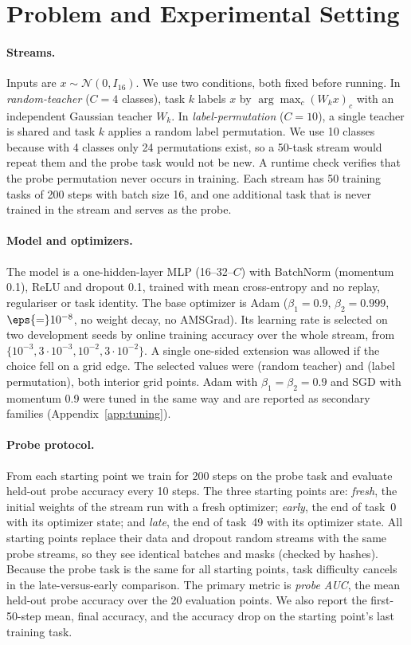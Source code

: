 \section{Problem and Experimental Setting}
\label{sec:setting}

\paragraph{Streams.}
Inputs are $x\sim\mathcal N(0,I_{16})$. We use two conditions, both fixed before running.
In \emph{random-teacher} ($C{=}4$ classes), task $k$ labels $x$ by $\arg\max_c (W_k x)_c$ with an
independent Gaussian teacher $W_k$. In \emph{label-permutation} ($C{=}10$), a single teacher is shared
and task $k$ applies a random label permutation. We use 10 classes because with 4 classes only 24
permutations exist, so a 50-task stream would repeat them and the probe task would not be new. A runtime
check verifies that the probe permutation never occurs in training. Each stream has 50 training tasks of
200 steps with batch size 16, and one additional task that is never trained in the stream and serves as
the probe.

\paragraph{Model and optimizers.}
The model is a one-hidden-layer MLP (16--32--$C$) with BatchNorm (momentum 0.1), ReLU and dropout 0.1,
trained with mean cross-entropy and no replay, regulariser or task identity. The base optimizer is Adam
($\beta_1{=}0.9$, $\beta_2{=}0.999$, $\eps{=}10^{-8}$, no weight decay, no AMSGrad). Its learning rate is
selected on two development seeds by online training accuracy over the whole stream, from
$\{10^{-3},3{\cdot}10^{-3},10^{-2},3{\cdot}10^{-2}\}$. A single one-sided extension was allowed if the
choice fell on a grid edge. The selected values were \RTTuneAdamLr{} (random teacher) and \LPTuneAdamLr{} (label permutation), both
interior grid points. Adam with $\beta_1{=}\beta_2{=}0.9$ and SGD with momentum 0.9 were tuned in the same way and are
reported as secondary families (Appendix~\ref{app:tuning}).

\paragraph{Probe protocol.}
From each starting point we train for 200 steps on the probe task and evaluate held-out probe accuracy
every 10 steps. The three starting points are:
\emph{fresh}, the initial weights of the stream run with a fresh optimizer;
\emph{early}, the end of task~0 with its optimizer state; and
\emph{late}, the end of task~49 with its optimizer state.
All starting points replace their data and dropout random streams with the same probe streams, so they
see identical batches and masks (checked by hashes). Because the probe task is the same for all starting
points, task difficulty cancels in the late-versus-early comparison. The primary metric is
\emph{probe AUC}, the mean held-out probe accuracy over the 20 evaluation points. We also report the
first-50-step mean, final accuracy, and the accuracy drop on the starting point's last training task.

